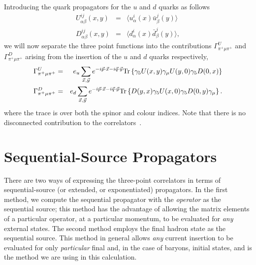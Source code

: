 \documentclass[12pt]{article}
\newcommand{\pdotx}{\vec{p} \cdot \vec{x}}
\begin{document}
Introducing the quark propagators for the $u$ and $d$ quarks as
follows
\begin{eqnarray}
U^{ij}_{\alpha\beta} (x,y) & = & \langle u^i_{\alpha}(x)
\bar{u}^j_{\beta}(y)\rangle\\
D^{ij}_{\alpha\beta} (x,y) & = & \langle d^i_{\alpha}(x)
\bar{d}^j_{\beta}(y)\rangle,
\end{eqnarray}
we will now separate the three point functions into the contributions
$\Gamma_{\pi^+ \mu \pi^+}^U$ and $\Gamma_{\pi^+ \mu \pi^+}^D$
arising from the insertion of the $u$ and $d$ quarks respectively,
\begin{eqnarray}
\Gamma_{\pi^+ \mu \pi^+}^U & = & e_u \sum_{\vec{x},\vec{y}} e^{-i
  \pdotx - i \vec{q}\cdot\vec{y}} {\rm Tr} \left\{
  \gamma_5 U(x,y) 
\gamma_{\mu} U(y,0)\gamma_5 D(0,x) \right\}\label{eq:u_quark_3pt}\\
\Gamma_{\pi^+ \mu \pi^+}^D & = & e_d \sum_{\vec{x},\vec{y}} e^{-i
  \pdotx - i \vec{q}\cdot\vec{y}} {\rm Tr} \left\{
  D(y,x) \gamma_5 U(x,0)\gamma_5 D(0,y)\gamma_{\mu} \right\}.
\label{eq:d_quark_3pt}
\end{eqnarray}
where the trace is over both the spinor and colour indices.
Note that there is no disconnected contribution to the
correlators~\cite{draper89}.

\section{Sequential-Source Propagators}
There are two ways of expressing the three-point correlators in terms
of sequential-source (or extended, or exponentiated) propagators.  In
the first method, we compute the sequential propagator with the
\textit{operator} as the sequential source; this method has the
advantage of allowing the matrix elements of a particular operator, at
a particular momentum, to be evaluated for \textit{any} external
states.  The second method employs the final hadron state as the
sequential source.  This method in general allows \textit{any} current
insertion to be evaluated for only \textit{particular} final and, in
the case of baryons, initial states, and is the method we are using in
this calculation.
\end{document}
